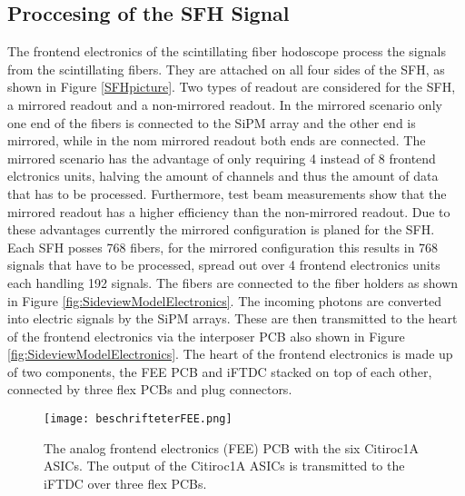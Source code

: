 \subsection{Proccesing of the SFH Signal}
The frontend electronics of the scintillating fiber hodoscope process the signals from the scintillating fibers.
They are attached on all four sides of the SFH, as shown in Figure \ref{SFHpicture}.
\newline 
Two types of readout are considered for the SFH, a mirrored readout and a non-mirrored readout.
In the mirrored scenario only one end of the fibers is connected to the SiPM array and the other end is mirrored,
while in the nom mirrored readout both ends are connected.\autocite{InternalcommunicationKarl}
\newline
The mirrored scenario has the advantage of only requiring 4 instead of 8 frontend elctronics units, halving the amount of channels and thus the amount of data that has to be processed.
Furthermore, test beam measurements show that the mirrored readout has a higher efficiency than the non-mirrored readout.\autocite{InternalcommunicationIgor}
\newline
Due to these advantages currently the mirrored configuration is planed for the SFH.\autocite{InternalcommunicationKarl}
\newline
Each SFH posses 768 fibers, for the mirrored configuration this results in 768 signals that have to be processed, spread out over 4 frontend electronics units each handling 192 signals. 
\newline
The fibers are connected to the fiber holders as shown in Figure \ref{fig:SideviewModelElectronics}.
The incoming photons are converted into electric signals by the SiPM arrays.
\newline
These are then transmitted to the heart of the frontend electronics via the interposer PCB also shown in Figure \ref{fig:SideviewModelElectronics}.
\newline
The heart of the frontend electronics is made up of two components, the FEE PCB and iFTDC stacked on top of each other,
connected by three flex PCBs and plug connectors.
\newline
\begin{figure}[H]
    \centering
    \texttt{[image: beschrifteterFEE.png]}
    \caption{The analog frontend electronics (FEE) PCB with the six Citiroc1A ASICs.
    The output of the Citiroc1A ASICs is transmitted to the iFTDC over three flex PCBs.\autocite{InternalcommunicationKarl}}
    \label{fig:FEE}
\end{figure}
